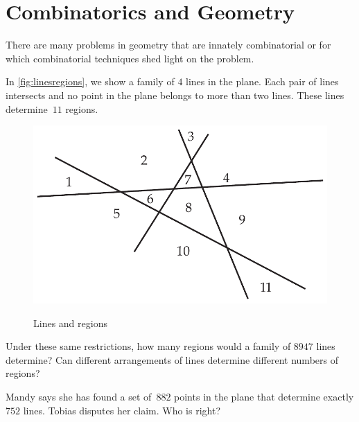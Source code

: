 \section{Combinatorics and Geometry}\label{s:intro:geom}

There are many problems in geometry that are innately combinatorial or
for which combinatorial techniques shed light on the problem.

\begin{example}  
  In \autoref{fig:linesregions}, we show a family of $4$ lines in
  the plane.  Each pair of lines intersects and no point in the plane
  belongs to more than two lines.  These lines determine~$11$ regions.

\begin{figure}[hbt]
\begin{center}
\includegraphics[scale=.6]{intro-figs/3012-fig9}\\
\end{center}
\caption{Lines and regions}
\label{fig:linesregions}
\end{figure}

Under these same restrictions, how many regions would a family of
$8947$ lines determine?  Can different arrangements of lines determine
different numbers of regions?
\end{example}

\begin{example}
Mandy says she has found a set of~$882$ points in the plane that
determine exactly $752$ lines.  Tobias disputes her claim.
Who is right?
\end{example}

